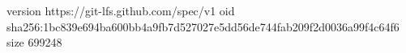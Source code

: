 version https://git-lfs.github.com/spec/v1
oid sha256:1bc839e694ba600bb4a9fb7d527027e5dd56de744fab209f2d0036a99f4c64f6
size 699248
